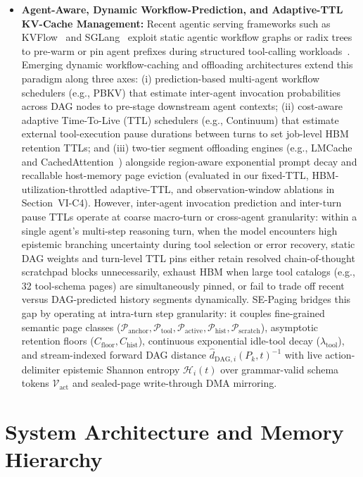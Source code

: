 \documentclass[conference,10pt]{IEEEtran}
\begin{document}
\begin{itemize}
    \item \textbf{Agent-Aware, Dynamic Workflow-Prediction, and Adaptive-TTL KV-Cache Management:} Recent agentic serving frameworks such as KVFlow~\cite{pan2025kvflow} and SGLang~\cite{zheng2024sglang} exploit static agentic workflow graphs or radix trees to pre-warm or pin agent prefixes during structured tool-calling workloads~\cite{patil2024gorilla, jimenez2024swebench}. Emerging dynamic workflow-caching and offloading architectures extend this paradigm along three axes: (i) prediction-based multi-agent workflow schedulers (e.g., PBKV) that estimate inter-agent invocation probabilities across DAG nodes to pre-stage downstream agent contexts; (ii) cost-aware adaptive Time-To-Live (TTL) schedulers (e.g., Continuum) that estimate external tool-execution pause durations between turns to set job-level HBM retention TTLs; and (iii) two-tier segment offloading engines (e.g., LMCache and CachedAttention~\cite{gao2024cachedattention}) alongside region-aware exponential prompt decay and recallable host-memory page eviction (evaluated in our fixed-TTL, HBM-utilization-throttled adaptive-TTL, and observation-window ablations in Section~VI-C4). However, inter-agent invocation prediction and inter-turn pause TTLs operate at coarse macro-turn or cross-agent granularity: within a single agent's multi-step reasoning turn, when the model encounters high epistemic branching uncertainty during tool selection or error recovery, static DAG weights and turn-level TTL pins either retain resolved chain-of-thought scratchpad blocks unnecessarily, exhaust HBM when large tool catalogs (e.g., 32 tool-schema pages) are simultaneously pinned, or fail to trade off recent versus DAG-predicted history segments dynamically. SE-Paging bridges this gap by operating at intra-turn step granularity: it couples fine-grained semantic page classes ($\mathcal{P}_{\text{anchor}}, \mathcal{P}_{\text{tool}}, \mathcal{P}_{\text{active}}, \mathcal{P}_{\text{hist}}, \mathcal{P}_{\text{scratch}}$), asymptotic retention floors ($C_{\text{floor}}, C_{\text{hist}}$), continuous exponential idle-tool decay ($\lambda_{\text{tool}}$), and stream-indexed forward DAG distance $\hat{d}_{\text{DAG},i}(P_k, t)^{-1}$ with live action-delimiter epistemic Shannon entropy $\mathcal{H}_i(t)$ over grammar-valid schema tokens $\mathcal{V}_{\text{act}}$ and sealed-page write-through DMA mirroring.
\end{itemize}

\section{System Architecture and Memory Hierarchy}
\end{document}
